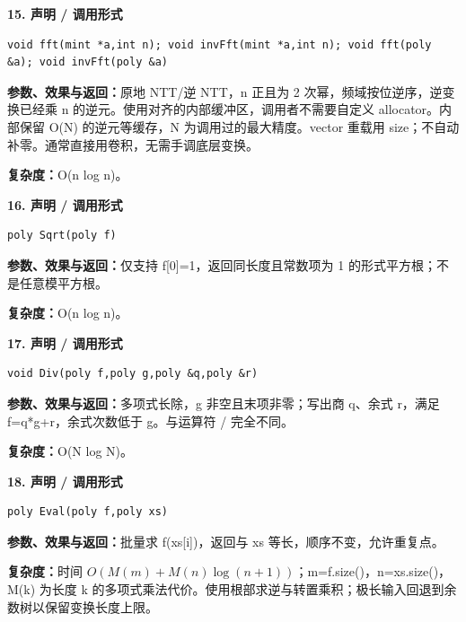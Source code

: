 \documentclass[UTF8,a4paper,10pt]{ctexart}
\begin{document}
\noindent\begin{minipage}{\textwidth}
\textbf{15. 声明 / 调用形式}
\begin{lstlisting}
void fft(mint *a,int n); void invFft(mint *a,int n); void fft(poly &a); void invFft(poly &a)
\end{lstlisting}
\textbf{参数、效果与返回：}原地 NTT/逆 NTT，n 正且为 2 次幂，频域按位逆序，逆变换已经乘 n 的逆元。使用对齐的内部缓冲区，调用者不需要自定义 allocator。内部保留 O(N) 的逆元等缓存，N 为调用过的最大精度。vector 重载用 size；不自动补零。通常直接用卷积，无需手调底层变换。

\textbf{复杂度：}O(n log n)。

\end{minipage}\par\vspace{0.4em}
\noindent\begin{minipage}{\textwidth}
\textbf{16. 声明 / 调用形式}
\begin{lstlisting}
poly Sqrt(poly f)
\end{lstlisting}
\textbf{参数、效果与返回：}仅支持 f[0]=1，返回同长度且常数项为 1 的形式平方根；不是任意模平方根。

\textbf{复杂度：}O(n log n)。

\end{minipage}\par\vspace{0.4em}
\noindent\begin{minipage}{\textwidth}
\textbf{17. 声明 / 调用形式}
\begin{lstlisting}
void Div(poly f,poly g,poly &q,poly &r)
\end{lstlisting}
\textbf{参数、效果与返回：}多项式长除，g 非空且末项非零；写出商 q、余式 r，满足 f=q*g+r，余式次数低于 g。与运算符 / 完全不同。

\textbf{复杂度：}O(N log N)。

\end{minipage}\par\vspace{0.4em}
\noindent\begin{minipage}{\textwidth}
\textbf{18. 声明 / 调用形式}
\begin{lstlisting}
poly Eval(poly f,poly xs)
\end{lstlisting}
\textbf{参数、效果与返回：}批量求 f(xs[i])，返回与 xs 等长，顺序不变，允许重复点。

\textbf{复杂度：}时间 $O(M(m)+M(n)\log(n+1))$；m=f.size()，n=xs.size()，M(k) 为长度 k 的多项式乘法代价。使用根部求逆与转置乘积；极长输入回退到余数树以保留变换长度上限。

\end{minipage}\par\vspace{0.4em}
\end{document}

